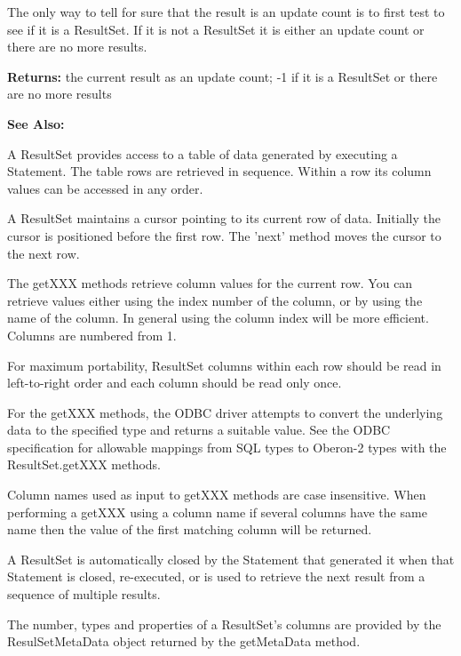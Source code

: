      The only way to tell for sure that the result is an update count is to first test to see if it is a ResultSet. If it is not a ResultSet it is either
     an update count or there are no more results. 

     {\bf Returns: } 
          the current result as an update count; -1 if it is a ResultSet or there are no more results 

     {\bf See Also:} 


\renewcommand{\CurClass}{ResultSet}
\Class{}

A ResultSet provides access to a table of data generated by executing a Statement. The table rows are retrieved in sequence. Within a row
its column values can be accessed in any order. 

A ResultSet maintains a cursor pointing to its current row of data. Initially the cursor is positioned before the first row. The 'next' method
moves the cursor to the next row. 

The getXXX methods retrieve column values for the current row. You can retrieve values either using the index number of the column, or by
using the name of the column. In general using the column index will be more efficient. Columns are numbered from 1. 

For maximum portability, ResultSet columns within each row should be read in left-to-right order and each column should be read only once.

For the getXXX methods, the ODBC driver attempts to convert the underlying data to the specified type and returns a suitable value.
See the ODBC specification for allowable mappings from SQL types to Oberon-2 types with the ResultSet.getXXX methods. 

Column names used as input to getXXX methods are case insensitive. When performing a getXXX using a column name if several columns
have the same name then the value of the first matching column will be returned. 

A ResultSet is automatically closed by the Statement that generated it when that Statement is closed, re-executed, or is used to retrieve the
next result from a sequence of multiple results. 

The number, types and properties of a ResultSet's columns are provided by the ResulSetMetaData object returned by the getMetaData
method. 

